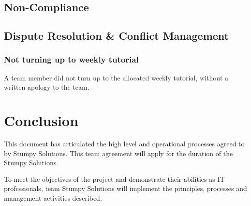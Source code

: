 \documentclass[12pt, a4paper, onecolumn]{article}
\begin{document}
\subsection{Non-Compliance}

\subsection{Dispute Resolution \& Conflict Management}

\subsubsection{Not turning up to weekly tutorial}
A team member did not turn up to the allocated weekly tutorial, without
a written apology to the team.

\newpage
\section{Conclusion}
This document has articulated the high level and operational
processes agreed to by Stumpy Solutions.  This team agreement
will apply for the duration of the Stumpy Solutions.

To meet the objectives of the project and demonstrate their
abilities as IT professionals, team Stumpy Solutions will implement
the principles, processes and management activities described.

\newpage
\begin{thebibliography}{9}
\end{thebibliography}

\newpage
\begin{appendices}
\end{appendices}
\end{document}
